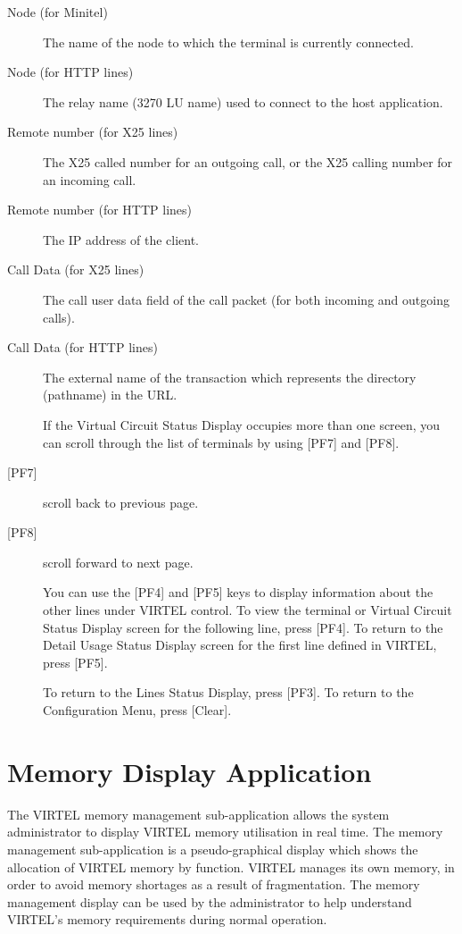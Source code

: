 \documentclass[letterpaper,10pt,english]{sphinxmanual}
\begin{document}
\begin{description}
\item[{Node (for Minitel)}] \leavevmode
The name of the node to which the terminal is currently connected.

\item[{Node (for HTTP lines)}] \leavevmode
The relay name (3270 LU name) used to connect to the host application.

\item[{Remote number (for X25 lines)}] \leavevmode
The X25 called number for an outgoing call, or the X25 calling number for an incoming call.

\item[{Remote number (for HTTP lines)}] \leavevmode
The IP address of the client.

\item[{Call Data (for X25 lines)}] \leavevmode
The call user data field of the call packet (for both incoming and outgoing calls).

\item[{Call Data (for HTTP lines)}] \leavevmode
The external name of the transaction which represents the directory (pathname) in the URL.

If the Virtual Circuit Status Display occupies more than one screen, you can scroll through the list of terminals by using {[}PF7{]} and {[}PF8{]}.

\item[{{[}PF7{]}}] \leavevmode
scroll back to previous page.

\item[{{[}PF8{]}}] \leavevmode
scroll forward to next page.

You can use the {[}PF4{]} and {[}PF5{]} keys to display information about the other lines under VIRTEL control. To view the terminal or Virtual Circuit Status Display screen for the following line, press {[}PF4{]}. To return to the Detail Usage Status Display screen for the first line defined in VIRTEL, press {[}PF5{]}.

To return to the Lines Status Display, press {[}PF3{]}. To return to the Configuration Menu, press {[}Clear{]}.

\end{description}

\newpage

\ignorespaces 

\section{Memory Display Application}
\label{\detokenize{audit_operations_ and_performance:memory-display-application}}\label{\detokenize{audit_operations_ and_performance:index-39}}
The VIRTEL memory management sub-application allows the system  administrator to display VIRTEL memory utilisation in real time. The memory management sub-application is a pseudo-graphical display which shows the allocation of VIRTEL memory by function. VIRTEL manages its own memory, in order to avoid memory shortages as a result of fragmentation. The memory management display can be used by the administrator to help understand VIRTEL’s memory requirements during normal operation.
\end{document}
